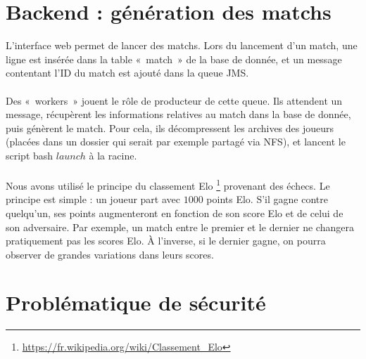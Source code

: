 \documentclass[10pt]{scrartcl}
\begin{document}
\section{Backend : génération des matchs}
  L'interface web permet de lancer des matchs. Lors du lancement d'un
  match, une ligne est insérée dans la table «~match~» de la base de
  donnée, et un message contentant l'ID du match est ajouté dans la
  queue JMS.

  \paragraph{}
  Des «~workers~» jouent le rôle de producteur de cette queue. Ils
  attendent un message, récupèrent les informations relatives au match
  dans la base de donnée, puis génèrent le match. Pour cela, ils décompressent
  les archives des joueurs (placées dans un dossier qui serait par exemple partagé
  via NFS), et lancent le script bash $launch$ à la racine.

  \paragraph{}
  Nous avons utilisé le principe du classement Elo
  \footnote{\url{https://fr.wikipedia.org/wiki/Classement\_Elo}} provenant
  des échecs. Le principe est simple : un joueur part avec $1000$ points Elo.
  S'il gagne contre quelqu'un, ses points augmenteront en fonction de son
  score Elo et de celui de son adversaire. Par exemple, un match entre le
  premier et le dernier ne changera pratiquement pas les scores Elo. À l'inverse,
  si le dernier gagne, on pourra observer de grandes variations dans leurs scores.

\section{Problématique de sécurité}
\end{document}
